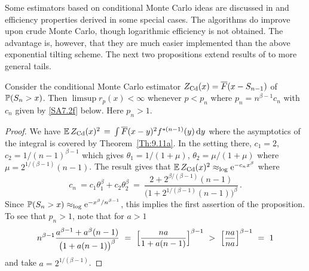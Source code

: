 Some  estimators  based on conditional Monte Carlo ideas
are discussed in \cite{asmussen2017conditional} and efficiency properties derived in some
special cases. The algorithms do improve upon crude Monte Carlo, though logarithmic
efficiency is not obtained. The advantage is, however, that they are much easier implemented than the above exponential tilting scheme. The next two propositions extend 
results of \cite{asmussen2017conditional} to more general tails. 

\begin{proposition}\label{Prop:SA7.2a} Consider the conditional Monte Carlo
estimator $Z_{\rm Cd}(x)=\overline F(x-S_{n-1})$ of $\operatorname{{\mathbb P}}(S_n>x)$. Then
$\limsup r_p(x)<\infty$ whenever $p<p_n$ where $p_n=n^{\beta-1}c_n$ with $c_n$ given by
\eqref{SA7.2f} below. Here $p_n>1$.
\end{proposition}
\begin{proof} We have
$\operatorname{{\mathbb E}} Z_{\rm Cd}(x)^2\,=\, \int \overline F(x-y)^2 f^{*(n-1)}(y)\, \mathrm{d} y$
where the asymptotics of the integral is covered by Theorem~\ref{Th:9.11a}. In the setting
there, $c_1=2$, $c_2=1/(n-1)^{\beta-1}$ which gives $\theta_1=1/(1+\mu)$,
$\theta_2=\mu/(1+\mu)$ where $\mu=2^{1/(\beta -1)}(n-1)$. The result gives that
$\operatorname{{\mathbb E}} Z_{\rm Cd}(x)^2\approx_{\log} \mathrm{e}^{-c_nx^\beta}$ where
\begin{equation}\label{SA7.2f}c_n\ = c_1\theta_1^\beta+c_2\theta_2^\beta\ =\ \frac{2+2^{\beta/(\beta-1)}(n-1)}
{\bigl(1+2^{1/(\beta-1)}(n-1)\bigr)^\beta}\,.
\end{equation}
Since $\operatorname{{\mathbb P}}(S_n>x)\approx_{\log}\mathrm{e}^{-x^\beta/n^{\beta-1}}$, this implies the first assertion of the proposition. To see that
$p_n>1$, note that for $a>1$
\[ n^{\beta-1}\frac{a^{\beta-1}+a^\beta (n-1)}{\bigl(1+a(n-1)\bigr)^\beta}\ =\ \Bigl[\frac{na}{1+a(n-1)}\Bigr]^{\beta-1}\ >\ \Bigl[\frac{na}{na}\Bigr]^{\beta-1}\ =\ 1
\]
and take $a=2^{1/(\beta-1)}$.
\end{proof}

